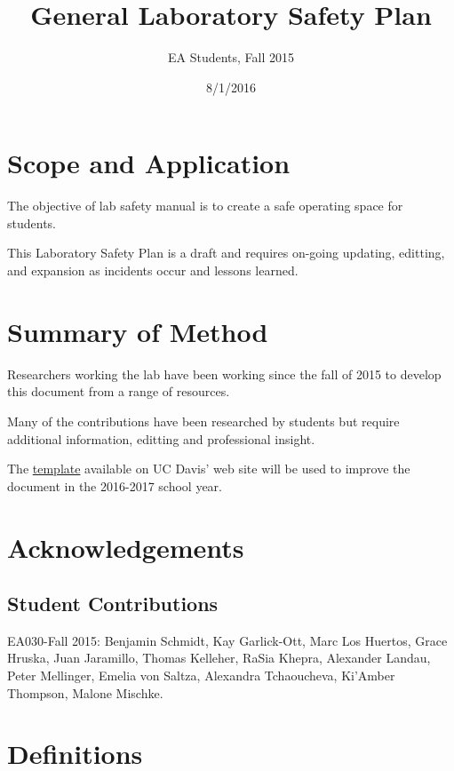 \documentclass[12pt]{../SOP3_beta}
\title{General Laboratory Safety Plan}
\date{8/1/2016}
\author{EA Students, Fall 2015}
\begin{document}


\maketitle



\section{Scope and Application}

\NP The objective of lab safety manual is to create a safe operating space for students.

\NP This Laboratory Safety Plan is a draft and requires on-going updating, editting, and expansion as incidents occur and lessons learned. 


\section{Summary of Method}

\NP Researchers working the lab have been working since the fall of 2015 to develop this document from a range of resources. 

\NP Many of the contributions have been researched by students but require additional information, editting and professional insight.

\NP The \href{http://safetyservices.ucdavis.edu/sites/default/files/documents/LabSafetyPlan_Template.docx}{template} available on UC Davis' web site will be used to improve the document in the 2016-2017 school year.

\tableofcontents

\section{Acknowledgements}

\subsection*{Student Contributions}

\NP EA030-Fall 2015: Benjamin Schmidt, Kay Garlick-Ott, Marc Los Huertos, Grace Hruska, Juan Jaramillo, Thomas Kelleher, RaSia Khepra, Alexander Landau, Peter Mellinger, Emelia von Saltza, Alexandra Tchaoucheva, Ki'Amber Thompson, Malone Mischke.



\section{Definitions}
\end{document}

